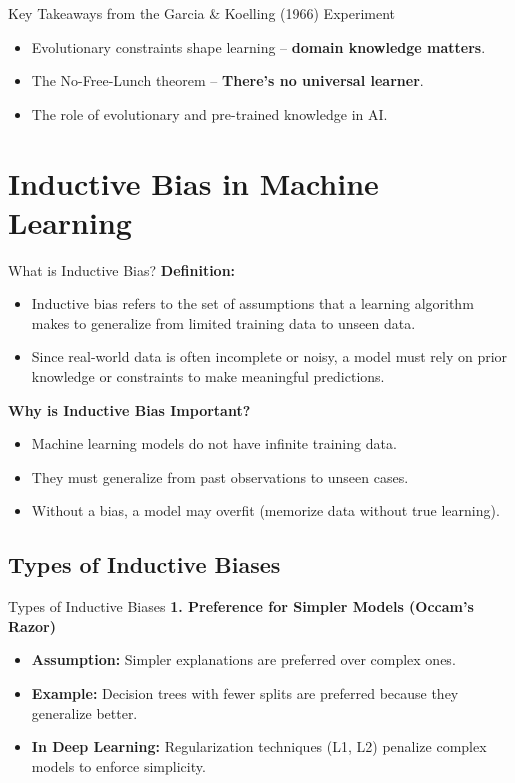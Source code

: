 \documentclass{beamer}
\begin{document}
\begin{frame}{Key Takeaways from the Garcia \& Koelling (1966) Experiment}
    \begin{itemize}
        \item Evolutionary constraints shape learning – \textbf{domain knowledge matters}.
        \item The No-Free-Lunch theorem – \textbf{There’s no universal learner}.
        \item The role of evolutionary and pre-trained knowledge in AI.
    \end{itemize}
\end{frame}



\section{Inductive Bias in Machine Learning}

\begin{frame}{What is Inductive Bias?}
    \textbf{Definition:}
    \begin{itemize}
        \item Inductive bias refers to the set of assumptions that a learning algorithm makes to generalize from limited training data to unseen data.
        \item Since real-world data is often incomplete or noisy, a model must rely on prior knowledge or constraints to make meaningful predictions.
    \end{itemize}

    \textbf{Why is Inductive Bias Important?}
    \begin{itemize}
        \item Machine learning models do not have infinite training data.
        \item They must generalize from past observations to unseen cases.
        \item Without a bias, a model may overfit (memorize data without true learning).
    \end{itemize}
\end{frame}

\subsection{Types of Inductive Biases}

\begin{frame}{Types of Inductive Biases}
    \textbf{1. Preference for Simpler Models (Occam’s Razor)}
    \begin{itemize}
        \item \textbf{Assumption:} Simpler explanations are preferred over complex ones.
        \item \textbf{Example:} Decision trees with fewer splits are preferred because they generalize better.
        \item \textbf{In Deep Learning:} Regularization techniques (L1, L2) penalize complex models to enforce simplicity.
    \end{itemize}
\end{frame} 
\end{document}
